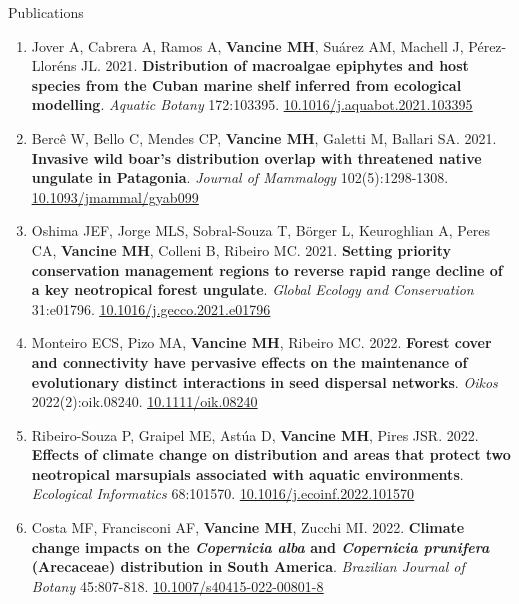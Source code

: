 \documentclass{resume}
\begin{document}
\begin{rSection}{Publications}
\begin{enumerate}
\item Jover A, Cabrera A, Ramos A, \textbf{Vancine MH}, Suárez AM, Machell J, Pérez-Lloréns JL. 2021. \textbf{Distribution of macroalgae epiphytes and host species from the Cuban marine shelf inferred from ecological modelling}. \textit{Aquatic Botany} 172:103395. \href{https://doi.org/10.1016/j.aquabot.2021.103395}{\underline{10.1016/j.aquabot.2021.103395}}

\item Bercê W, Bello C, Mendes CP, \textbf{Vancine MH}, Galetti M, Ballari SA. 2021. \textbf{Invasive wild boar’s distribution overlap with threatened native ungulate in Patagonia}. \textit{Journal of Mammalogy} 102(5):1298-1308. \href{https://doi.org/10.1093/jmammal/gyab099}{\underline{10.1093/jmammal/gyab099}}

\item Oshima JEF, Jorge MLS, Sobral-Souza T, Börger L, Keuroghlian A, Peres CA, \textbf{Vancine MH}, Colleni B, Ribeiro MC. 2021. \textbf{Setting priority conservation management regions to reverse rapid range decline of a key neotropical forest ungulate}. \textit{Global Ecology and Conservation} 31:e01796. \href{https://doi.org/10.1016/j.gecco.2021.e01796}{\underline{10.1016/j.gecco.2021.e01796}}

\item Monteiro ECS, Pizo MA, \textbf{Vancine MH}, Ribeiro MC. 2022. \textbf{Forest cover and connectivity have pervasive effects on the maintenance of evolutionary distinct interactions in seed dispersal networks}. \textit{Oikos} 2022(2):oik.08240. \href{https://doi.org/10.1111/oik.08240}{\underline{10.1111/oik.08240}}

\item Ribeiro-Souza P, Graipel ME, Astúa D, \textbf{Vancine MH}, Pires JSR. 2022. \textbf{Effects of climate change on distribution and areas that protect two neotropical marsupials associated with aquatic environments}. \textit{Ecological Informatics} 68:101570. \href{https://doi.org/10.1016/j.ecoinf.2022.101570}{\underline{10.1016/j.ecoinf.2022.101570}}

\item Costa MF, Francisconi AF, \textbf{Vancine MH}, Zucchi MI. 2022. \textbf{Climate change impacts on the \textbf{\textit{Copernicia alba}} and \textbf{\textit{Copernicia prunifera}} (Arecaceae) distribution in South America}. \textit{Brazilian Journal of Botany} 45:807-818. \href{https://doi.org/10.1007/s40415-022-00801-8}{\underline{10.1007/s40415-022-00801-8}}


\end{enumerate}
\end{rSection}
\end{document}
